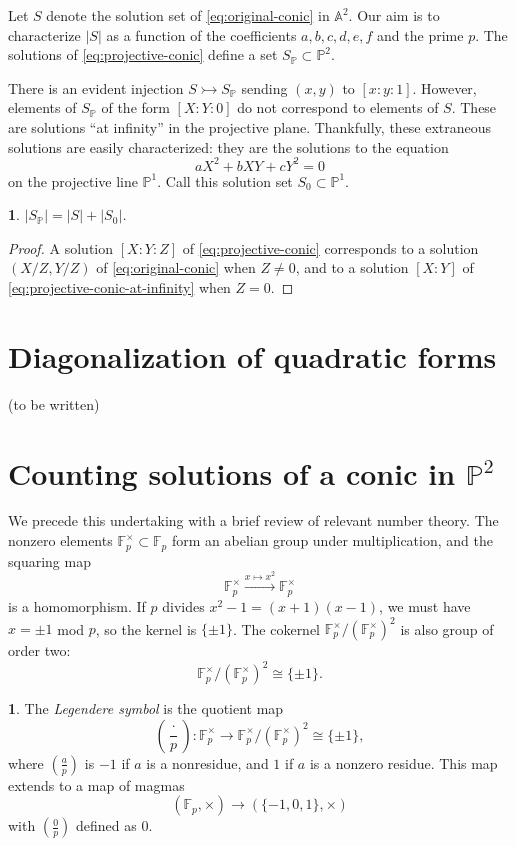 \documentclass[10pt,a4paper]{amsart}
\numberwithin{equation}{section}
\numberwithin{figure}{section}
\theoremstyle{definition}
\theoremstyle{remark}
\theoremstyle{plain}
\theoremstyle{plain}
\theoremstyle{definition}
\newtheorem{defn}{\protect\definitionname}[section]
\theoremstyle{plain}
\theoremstyle{plain}
\newtheorem{lem}{\protect\lemmaname}[section]
\providecommand{\definitionname}{Definition}
\providecommand{\lemmaname}{Lemma}
\newcommand{\legendre}[2]{\genfrac{(}{)}{}{}{#1}{#2}}
\newcommand{\A}{\mathbb{A}}
\renewcommand{\P}{\mathbb{P}}
\newcommand{\F}{\mathbb{F}}
\begin{document}
    Let $S$ denote the solution set of \eqref{eq:original-conic} in $\A^2$. Our aim
    is to characterize $|S|$ as a function of the coefficients $a,b,c,d,e,f$ and 
    the prime $p$. The solutions of \eqref{eq:projective-conic} define a set
    $S_\P \subset \P^2$.

    There is an evident injection $S \rightarrowtail S_\P$ sending $(x,y)$ to
    $[x:y:1]$. However, elements of $S_\P$ of the form $[X:Y:0]$ do not 
    correspond to elements of $S$. 
    These are solutions ``at infinity'' in the projective plane.
    Thankfully, these extraneous solutions are easily characterized: they are the
    solutions to the equation
    \begin{equation}\label{eq:projective-conic-at-infinity} 
        aX^2 + bXY + cY^2 = 0
    \end{equation} 
    on the projective line $\P^1$. Call this solution set $S_0\subset \P^1$.  

    \begin{lem} 
        $|S_\P| = |S| + |S_0|$.
    \end{lem} 
    \begin{proof}
        A solution $[X:Y:Z]$ of \eqref{eq:projective-conic} corresponds 
        to a solution $(X/Z,Y/Z)$ of \eqref{eq:original-conic} when $Z \neq 0$,
        and to a solution $[X:Y]$ of \eqref{eq:projective-conic-at-infinity} 
        when $Z = 0$.  
    \end{proof}

    \section{Diagonalization of quadratic forms}
    \label{sec:diagonalizing-quadratic-forms} 

    (to be written)

    \section{Counting solutions of a conic in $\P^2$} 

    We precede this undertaking with a brief review of relevant number theory.
    The nonzero elements $\F_p^\times \subset \F_p$ form an abelian
    group under multiplication, and the squaring map 
    \[ \F^\times_p \xrightarrow{x \mapsto x^2} \F^\times_p \] 
    is a homomorphism. If $p$ divides $x^2 - 1 = (x+1)(x-1)$, we must have 
    $x = \pm 1$ mod $p$, so the kernel is $\{\pm 1\}$. 
    The cokernel $\F_p^\times / (\F_p^\times)^2$ is also group of order two: 
    \[ \F_p^\times / (\F_p^\times)^2 \cong \{\pm 1\}.  \]
    \begin{defn}
        The \emph{Legendere symbol} is the quotient map    
        \[ \legendre{\cdot}{p}: 
            \F_p^\times \to \F_p^\times / (\F_p^\times)^2 \cong \{\pm 1\}, \]
        where $\legendre{a}{p}$ is $-1$ if $a$ is a nonresidue,
        and $1$ if $a$ is a nonzero residue. This map extends to a map of magmas
        \[ (\F_p,\times) \to (\{-1,0,1\}, \times) \]
        with $\legendre{0}{p}$ defined as $0$.
    \end{defn}
    
\end{document}
